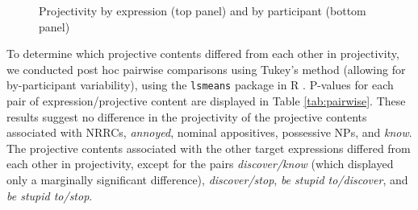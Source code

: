 \documentclass[11pt,fleqn]{article}
\newcommand{\6}{\mbox{$[\hspace*{-.6mm}[$}}
\newcommand{\9}{\mbox{$]\hspace*{-.6mm}]$}}
\newcommand{\tableref}[1]{Table \ref{#1}}
\begin{document}
\begin{figure}[h!]
\centering


	

\caption{Projectivity by expression (top panel) and by participant (bottom panel)}
\label{fig:f-proj-1a}
\end{figure}

To determine which projective contents differed from each other in projectivity, we conducted post hoc pairwise comparisons using Tukey's method (allowing for by-participant variability), using the \verb|lsmeans| package \citep{tukey} in R \citep{r}. P-values for each pair of expression/projective content are displayed in \tableref{tab:pairwise}. These results suggest no difference in the projectivity of the projective contents associated with NRRCs, \emph{annoyed}, nominal appositives, possessive NPs, and \emph{know}. The projective contents associated with the other target expressions differed from each other in projectivity, except for the pairs \emph{discover/know} (which displayed only a marginally significant difference), \emph{discover/stop}, \emph{be stupid to/discover}, and \emph{be stupid to/stop}. 
\end{document}
